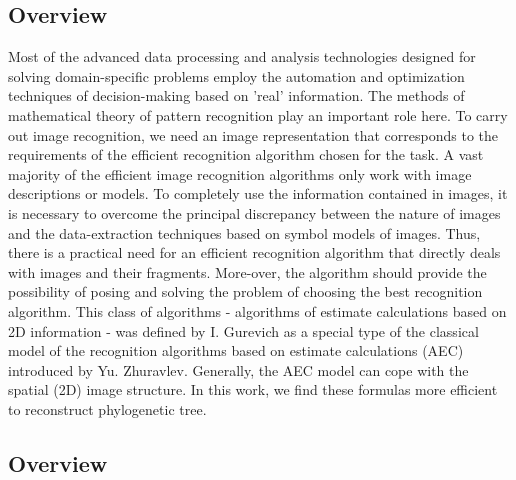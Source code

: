 \subsection{Overview \cite{kamilov, juravlyov}} Most of the advanced data processing and analysis technologies 
designed for solving domain-specific problems employ the automation and 
optimization techniques of decision-making based on 'real' information. 
The methods of mathematical theory of pattern recognition play an important role here. 
To carry out image recognition, we need an image representation that 
corresponds to the requirements of the efficient recognition algorithm chosen 
for the task. A vast majority of the efficient image recognition algorithms 
only work with image descriptions or models. To completely use the information 
contained in images, it is necessary to overcome the principal discrepancy between 
the nature of images and the data-extraction techniques based on symbol models of 
images. Thus, there is a practical need for an efficient recognition algorithm that 
directly deals with images and their fragments. More-over, the algorithm should 
provide the possibility of posing and solving the problem of choosing the best
recognition algorithm. This class of algorithms - algorithms of estimate calculations 
based on 2D information - was defined by I. Gurevich as a special type of 
the classical model of the recognition algorithms based on estimate calculations 
(AEC) introduced by Yu. Zhuravlev. Generally, the AEC model can cope with the spatial 
(2D) image structure. In this work, we find these formulas more efficient to reconstruct
phylogenetic tree.

\subsection{Overview}


